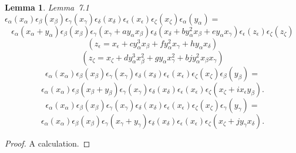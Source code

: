 \documentclass{memo-l}
\newtheorem{lemma}[theorem]{Lemma}
\theoremstyle{definition}
\theoremstyle{remark}
\numberwithin{section}{chapter}
\numberwithin{equation}{chapter}
\begin{document}
\begin{lemma}{Lemma\ 7.1}  ${\epsilon}_{{\alpha}}(x_{{\alpha}})
{\epsilon}_{{\beta}}(x_{{\beta}}){\epsilon}_{{\gamma}}(x_{{\gamma}})
{\epsilon}_{{\delta}}(x_{{\delta}}){\epsilon}_{{\epsilon}}(x_{{\epsilon}})
{\epsilon}_{{\zeta}}(x_{{\zeta}}){\epsilon}_{{\alpha}}(y_{{\alpha}}) =$
$$
{\epsilon}_{{\alpha}}(x_{{\alpha}}+y_{{\alpha}}){\epsilon}_{{\beta}}
(x_{{\beta}}){\epsilon}_{{\gamma}}(x_{{\gamma}}+ay_{{\alpha}}x_{{\beta}})
{\epsilon}_{{\delta}}(x_{{\delta}}+by_{{\alpha}}^{2}x_{{\beta}}+ey_{{\alpha}}
x_{{\gamma}}){\epsilon}_{{\epsilon}}(z_{{\epsilon}}){\epsilon}_{{\zeta}}
(z_\zeta)
$$  
$$
(z_{{\epsilon}} = x_{{\epsilon}}+cy_{{\alpha}}^{3}x_{{\beta}} + 
fy_{{\alpha}}^{2}x_{{\gamma}}+hy_{{\alpha}}x_{{\delta}})$$
$$(z_{{\zeta}} = x_{{\zeta}}+dy_{{\alpha}}^{3}x_{{\beta}}^{2}+gy_{{\alpha}}
x_{{\gamma}}^{2}+bjy_{{\alpha}}^{2}x_{{\beta}}x_{{\gamma}})$$
$${\epsilon}_{{\alpha}}(x_{{\alpha}}){\epsilon}_{{\beta}}(x_{{\beta}})
{\epsilon}_{{\gamma}}(x_{{\gamma}}){\epsilon}_{{\delta}}(x_{{\delta}})
{\epsilon}_{{\epsilon}}(x_{{\epsilon}}){\epsilon}_{{\zeta}}(x_{{\zeta}})
{\epsilon}_{{\beta}}(y_{{\beta}}) =$$
$${\epsilon}_{{\alpha}}(x_{{\alpha}}){\epsilon}_{{\beta}}(x_{{\beta}} + 
y_{{\beta}}){\epsilon}_{{\gamma}}(x_{{\gamma}}){\epsilon}_{{\delta}}
(x_{{\delta}}){\epsilon}_{{\epsilon}}(x_{{\epsilon}}){\epsilon}_{{\zeta}}
(x_{{\zeta}}+ix_{{\epsilon}}y_\beta).$$
$${\epsilon}_{{\alpha}}(x_{{\alpha}}){\epsilon}_{{\beta}}(x_{{\beta}})
{\epsilon}_{{\gamma}}(x_{{\gamma}}){\epsilon}_{{\delta}}(x_{{\delta}})
{\epsilon}_{{\epsilon}}(x_{{\epsilon}}){\epsilon}_{{\zeta}}(x_{{\zeta}})
{\epsilon}_{{\gamma}}(y_{{\gamma}}) =$$
$${\epsilon}_{{\alpha}}(x_{{\alpha}}){\epsilon}_{{\beta}}(x_{{\beta}})
{\epsilon}_{{\gamma}}(x_{{\gamma}}+y_{{\gamma}}){\epsilon}_{{\delta}}
(x_{{\delta}}){\epsilon}_{{\epsilon}}(x_{{\epsilon}}){\epsilon}_{{\zeta}}
(x_{{\zeta}}+jy_{{\gamma}}x_{\delta}).$$
\end{lemma}

\begin{proof}    A calculation. 
\end{proof} 

{\medskip}
\end{document}
